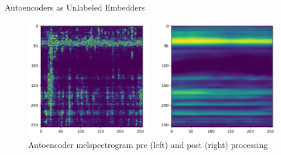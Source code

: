 \begin{frame}{Autoencoders as Unlabeled Embedders}
    \begin{figure}
        \begin{columns}
            \begin{column}{0.5\textwidth}
                \includegraphics[height=\textheight,width=\textwidth,keepaspectratio]{images/pre_mel.png}
            \end{column}
            \begin{column}{0.5\textwidth}
                \includegraphics[height=\textheight,width=\textwidth,keepaspectratio]{images/post_mel.png}
            \end{column}
        \end{columns}
        \caption{Autoencoder melspectrogram pre (left) and post (right) processing }
    \end{figure}
\end{frame}

